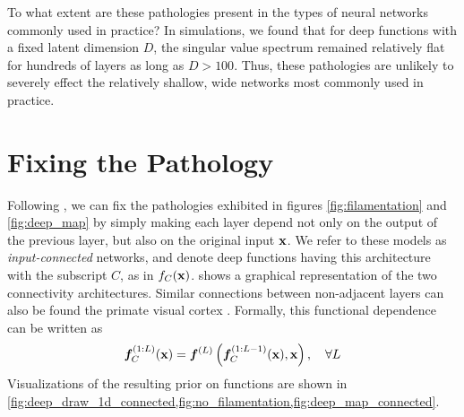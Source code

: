 To what extent are these pathologies present in the types of neural networks commonly used in practice?
In simulations, we found that for deep functions with a fixed latent dimension $D$, the singular value spectrum remained relatively flat for hundreds of layers as long as $D > 100$.
Thus, these pathologies are unlikely to severely effect the relatively shallow, wide networks most commonly used in practice.





\section{Fixing the Pathology}
\label{sec:fix}

Following \citet{neal1995bayesian}, we can fix the pathologies exhibited in figures \cref{fig:filamentation} and \ref{fig:deep_map} by simply making each layer depend not only on the output of the previous layer, but also on the original input ${\bf{x}}$.  
We refer to these models as \emph{input-connected} networks, and denote deep functions having this architecture with the subscript $C$, as in $f_C({\bf{x}})$.
 shows a graphical representation of the two connectivity architectures.
Similar connections between non-adjacent layers can also be found the primate visual cortex \citep{maunsell1983connections}.
Formally, this functional dependence can be written as
\begin{align}
\boldsymbol{f}_C^{(1:L)}({\bf{x}}) = \boldsymbol{f}^{(L)} \left( \boldsymbol{f}_C^{(1:L-1)}({\bf{x}}), {\bf{x}} \right), \quad \forall L
\end{align}
%
Visualizations of the resulting prior on functions are shown in \cref{fig:deep_draw_1d_connected,fig:no_filamentation,fig:deep_map_connected}.

